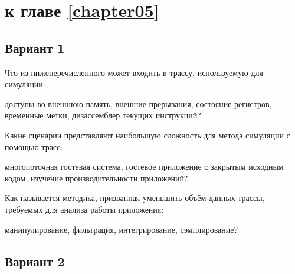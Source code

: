 \section{\Questions к главе \ref{chapter05}} %

\subsection*{Вариант 1}

\begin{questions}

\question[3] Что из нижеперечисленного может входить в трассу, используемую для симуляции:
\begin{choices}
    \correctchoice доступы во внешнюю память,
    \correctchoice внешние прерывания,
    \choice состояние регистров,
    \correctchoice временные метки,
    \choice дизассемблер текущих инструкций?
\end{choices}

\question[3] Какие сценарии представляют наибольшую сложность для метода симуляции с помощью трасс:
\begin{choices}
\correctchoice многопоточная гостевая система,
\choice гостевое приложение с закрытым исходным кодом,
\choice изучение производительности приложений?
\end{choices}

\question[3] Как называется методика, призванная уменьшить объём данных трассы, требуемых для анализа работы приложения:
\begin{choices}
\choice манипулирование,
\choice фильтрация,
\choice интегрирование,
\correctchoice сэмплирование?
\end{choices}

\end{questions}

\subsection*{Вариант 2}

